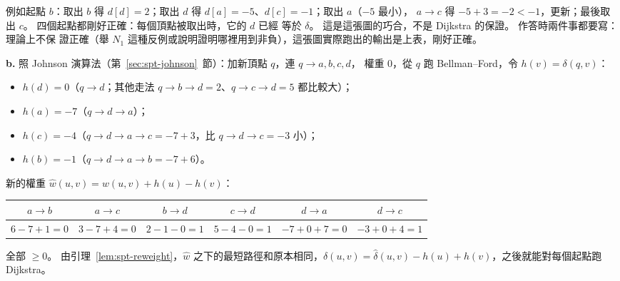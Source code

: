 例如起點 $b$：取出 $b$ 得 $d[d] = 2$；取出 $d$ 得 $d[a] = -5$、$d[c] = -1$；取出 $a$（$-5$ 最小），
$a \to c$ 得 $-5 + 3 = -2 < -1$，更新；最後取出 $c$。 四個起點都剛好正確：每個頂點被取出時，它的 $d$ 已經
等於 $\delta$。 這是這張圖的巧合，不是 Dijkstra 的保證。 作答時兩件事都要寫：理論上不保
證正確（舉 $N_1$ 這種反例或說明證明哪裡用到非負），這張圖實際跑出的輸出是上表，剛好正確。

\textbf{b.} 照 Johnson 演算法（第~\ref{sec:spt-johnson}~節）：加新頂點 $q$，連 $q \to a, b, c, d$，
權重 $0$，從 $q$ 跑 Bellman--Ford，令 $h(v) = \delta(q, v)$：
\begin{itemize}
\item $h(d) = 0$（$q \to d$；其他走法 $q \to b \to d = 2$、$q \to c \to d = 5$ 都比較大）；
\item $h(a) = -7$（$q \to d \to a$）；
\item $h(c) = -4$（$q \to d \to a \to c = -7 + 3$，比 $q \to d \to c = -3$ 小）；
\item $h(b) = -1$（$q \to d \to a \to b = -7 + 6$）。
\end{itemize}
新的權重 $\hat{w}(u, v) = w(u, v) + h(u) - h(v)$：
\begin{center}
\small
\begin{tabular}{cccccc}
\toprule
$a \to b$ & $a \to c$ & $b \to d$ & $c \to d$ & $d \to a$ & $d \to c$ \\
\midrule
$6 - 7 + 1 = 0$ & $3 - 7 + 4 = 0$ & $2 - 1 - 0 = 1$ & $5 - 4 - 0 = 1$ & $-7 + 0 + 7 = 0$ & $-3 + 0 + 4 = 1$ \\
\bottomrule
\end{tabular}
\end{center}
全部 $\ge 0$。 由引理~\ref{lem:spt-reweight}，$\hat{w}$ 之下的最短路徑和原本相同，$\delta(u, v) =
\hat{\delta}(u, v) - h(u) + h(v)$，之後就能對每個起點跑 Dijkstra。

